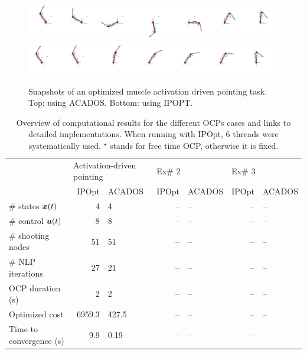  

%
\begin{figure}[t!]
\centering
\includegraphics[width=\textwidth]{figures/activation_pointing_snapshots_acados.png}\\
\vspace*{0.5em}
\includegraphics[width=\textwidth]{figures/activation_pointing_snapshots_ipopt.png}
\caption{Snapshots of an optimized muscle activation driven pointing task. Top: using ACADOS. Bottom: using IPOPT.}
\label{fig:snapshots_activation_driven_pointing}
\end{figure}
%

%
\begin{table}[t!]
\caption{\small Overview of computational results for the different OCPs cases and links to detailed implementations. When running with IPOpt, 6 threads were systematically used. $^\star$ stands for free time OCP, otherwise it is fixed.}
\label{tab:Perfs_and_detailed_implementations_of_each_example}
\centering
\begin{tabular}{l rl rl rl}
\toprule
& \multicolumn{2}{l}{Activation-driven pointing} & \multicolumn{2}{l}{Ex\# 2} & \multicolumn{2}{l}{Ex\# 3} \\
\cmidrule[\heavyrulewidth](lr){2-3}
\cmidrule[\heavyrulewidth](lr){4-5}
\cmidrule[\heavyrulewidth](lr){6-7}
                           & IPOpt  & ACADOS & IPOpt & ACADOS & IPOpt & ACADOS\\
\# states $\bm{x}(t)$            & 4      & 4      & --    & --     & --    & --\\
\# control $\bm{u}(t)$           & 8      & 8      & --    & --     & --    & --\\
\# shooting nodes          & 51     & 51     & --    & --     & --    & --\\
\# NLP iterations          & 27     & 21     & --    & --     & --    & --\\
OCP duration (s)           & 2      & 2      & --    & --     & --    & --\\
Optimized cost             & 6959.3 & 427.5  & --    & --     & --    & --\\
Time to convergence (s)    & 9.9    & 0.19   & --    & --     & --    & --\\
\bottomrule
\end{tabular}
\end{table}
%